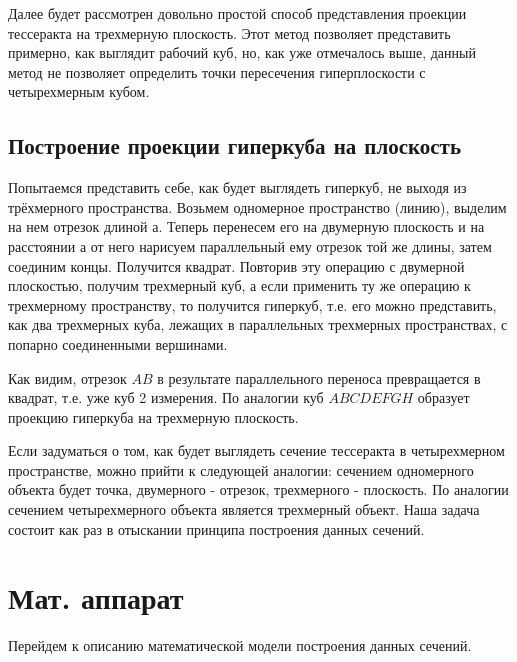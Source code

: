 \documentclass[12pt, a4paper, twoside]{report}
\begin{document}
Далее будет рассмотрен довольно простой способ представления проекции тессеракта на трехмерную плоскость. Этот метод позволяет представить примерно, как выглядит рабочий куб, но, как уже отмечалось выше, данный метод не позволяет определить точки пересечения гиперплоскости с четырехмерным кубом.
\subsection{Построение проекции гиперкуба на плоскость}
Попытаемся представить себе, как будет выглядеть гиперкуб, не выходя из трёхмерного пространства. Возьмем одномерное пространство (линию), выделим на нем отрезок длиной $а$. Теперь перенесем его на двумерную плоскость и на расстоянии $а$ от него нарисуем параллельный ему отрезок той же длины, затем соединим концы. Получится квадрат. Повторив эту операцию с двумерной плоскостью, получим трехмерный куб, а если применить ту же операцию к трехмерному пространству, то получится гиперкуб, т.е. его можно представить, как два трехмерных куба, лежащих в параллельных трехмерных пространствах, с попарно соединенными вершинами. 

\begin{figure}[h!]
	\clearpage
\end{figure}

Как видим, отрезок $AB$ в результате параллельного переноса превращается в квадрат, т.е. уже куб 2 измерения. По аналогии куб $ABCDEFGH$ образует проекцию гиперкуба на трехмерную плоскость.

Если задуматься о том, как будет выглядеть сечение тессеракта в четырехмерном пространстве, можно прийти к следующей аналогии: сечением одномерного объекта будет точка, двумерного -  отрезок, трехмерного - плоскость. По аналогии сечением четырехмерного объекта является трехмерный объект. Наша задача состоит как раз в отыскании принципа построения данных сечений.

\section{Мат. аппарат}
Перейдем к описанию математической модели построения данных сечений.
\end{document}
